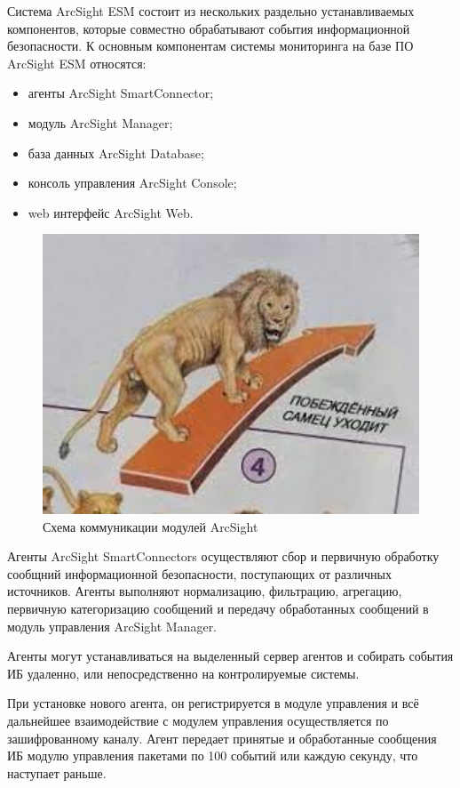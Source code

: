 Система ArcSight ESM состоит из нескольких раздельно устанавливаемых компонентов, которые совместно обрабатывают события информационной безопасности. К основным компонентам системы мониторинга на базе ПО ArcSight ESM относятся:
\begin{itemize}
    \newpage
    \item агенты ArcSight SmartConnector;
    \item модуль ArcSight Manager;
    \item база данных ArcSight Database;
    \item консоль управления ArcSight Console;
    \item web интерфейс ArcSight Web.
\end{itemize}

\begin{figure}[H]
  \centering
  \includegraphics[width=1\textwidth]{resources/13.jpg}
  \caption{Схема коммуникации модулей ArcSight}
  \label{comm}
\end{figure}

Агенты ArcSight SmartConnectors осуществляют сбор и первичную обработку сообщний информационной безопасности, поступающих от различных источников. Агенты выполняют нормализацию, фильтрацию, агрегацию, первичную категоризацию сообщений и передачу обработанных сообщений в модуль управления ArcSight Manager.

Агенты могут устанавливаться на выделенный сервер агентов и собирать события ИБ удаленно, или непосредственно на контролируемые системы.

При установке нового агента, он регистрируется в модуле управления и всё дальнейшее взаимодействие с модулем управления осуществляется по зашифрованному каналу. Агент передает принятые и обработанные сообщения ИБ модулю управления пакетами по 100 событий или каждую секунду, что наступает раньше.

